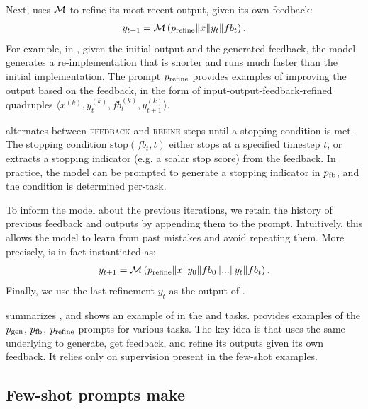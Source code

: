 \paragraph{\itermod}
Next, \ours uses $\mathcal{M}$ to refine its most recent output, given its own feedback:
\begin{align}
    y_{t+1} = \mathcal{M}\left(p_{\text{refine}} \| x \| y_t \| fb_t\right).
    \label{eq:refine}
\end{align}
For example, in , given the initial output and the generated feedback, the model generates a re-implementation that is shorter and runs much faster than the initial implementation.
The prompt $p_{\text{refine}}$ provides examples 
of improving the output based on the feedback, in the form of input-output-feedback-refined quadruples $\langle x^{(k)}, y_t^{(k)}, fb_t^{(k)}, y_{t+1}^{(k)} \rangle$.

\ours alternates between \textsc{feedback} and \textsc{refine} steps until a stopping condition is met. 
The stopping condition $\mathrm{stop}(fb_t, t)$ either stops at a specified timestep $t$, or extracts a stopping indicator (e.g. a scalar stop score) from the feedback.
In practice, the model can be prompted to generate a stopping indicator in $p_{\text{fb}}$, and the condition is determined per-task.

To inform the model about the previous iterations, we retain the history of previous feedback and outputs by appending them to the prompt. 
Intuitively,
this allows the model to learn from past mistakes and avoid repeating them. More precisely,  is in fact instantiated as: 
\begin{align}
\label{eqn:refine2}
    y_{t+1} = \mathcal{M}\left(p_{\text{refine}} \| x \| y_0 \| fb_0 \| ... \| y   _t \| fb_t\right).
\end{align}
Finally, we use the last refinement $y_{t}$ as the output of \ours. 

 summarizes \ours, and  shows an example of \ours in the \dialgen \citep{mehri-eskenazi-2020-unsupervised} and \codeopt \citep{pie} tasks. 
 provides examples of the 
$p_{\text{gen}}$, $p_{\text{fb}}$, $p_{\text{refine}}$ prompts for various tasks.
The key idea is that \ours uses the same underlying \llm to generate, get feedback, and refine its outputs given its own feedback. It relies only on supervision present in the few-shot examples.

\subsection{Few-shot prompts make \ours {}}
\label{subsec:prompts}

